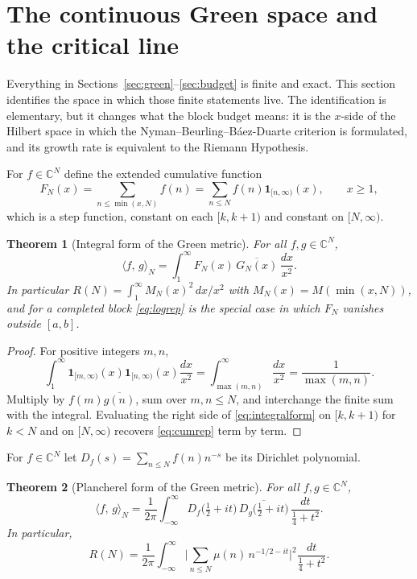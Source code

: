 \documentclass[11pt]{article}
\newtheorem{theorem}{Theorem}[section]
\theoremstyle{definition}
\theoremstyle{remark}
\newcommand{\C}{\mathbb{C}}
\newcommand{\ip}[2]{\langle #1,\, #2\rangle}
\begin{document}
\section{The continuous Green space and the critical line}\label{sec:continuous}

Everything in Sections~\ref{sec:green}--\ref{sec:budget} is finite and exact. This section identifies the space in which those finite statements live. The identification is elementary, but it changes what the block budget means: it is the $x$-side of the Hilbert space in which the Nyman--Beurling--B\'aez-Duarte criterion is formulated, and its growth rate is equivalent to the Riemann Hypothesis.

For $f\in\C^N$ define the extended cumulative function
\begin{equation}
F_N(x)=\sum_{n\le\min(x,N)}f(n)=\sum_{n\le N}f(n)\mathbf 1_{[n,\infty)}(x),\qquad x\ge1,
\end{equation}
which is a step function, constant on each $[k,k+1)$ and constant on $[N,\infty)$.

\begin{theorem}[Integral form of the Green metric]\label{thm:integral}
For all $f,g\in\C^N$,
\begin{equation}\label{eq:integralform}
\ip{f}{g}_N=\int_1^\infty F_N(x)\,\overline{G_N(x)}\,\frac{dx}{x^2}.
\end{equation}
In particular $R(N)=\int_1^\infty M_N(x)^2\,dx/x^2$ with $M_N(x)=M(\min(x,N))$, and for a completed block \eqref{eq:logrep} is the special case in which $F_N$ vanishes outside $[a,b]$.
\end{theorem}

\begin{proof}
For positive integers $m,n$,
\[
\int_1^\infty\mathbf 1_{[m,\infty)}(x)\mathbf 1_{[n,\infty)}(x)\frac{dx}{x^2}=\int_{\max(m,n)}^\infty\frac{dx}{x^2}=\frac1{\max(m,n)}.
\]
Multiply by $f(m)\overline{g(n)}$, sum over $m,n\le N$, and interchange the finite sum with the integral. Evaluating the right side of \eqref{eq:integralform} on $[k,k+1)$ for $k<N$ and on $[N,\infty)$ recovers \eqref{eq:cumrep} term by term.
\end{proof}

For $f\in\C^N$ let $D_f(s)=\sum_{n\le N}f(n)n^{-s}$ be its Dirichlet polynomial.

\begin{theorem}[Plancherel form of the Green metric]\label{thm:plancherel}
For all $f,g\in\C^N$,
\begin{equation}\label{eq:plancherel}
\ip{f}{g}_N=\frac1{2\pi}\int_{-\infty}^{\infty}D_f\big(\tfrac12+it\big)\,\overline{D_g\big(\tfrac12+it\big)}\,\frac{dt}{\frac14+t^2}.
\end{equation}
In particular,
\begin{equation}\label{eq:RNplancherel}
R(N)=\frac1{2\pi}\int_{-\infty}^\infty\Big|\sum_{n\le N}\mu(n)\,n^{-1/2-it}\Big|^2\frac{dt}{\frac14+t^2}.
\end{equation}
\end{theorem}
\end{document}
